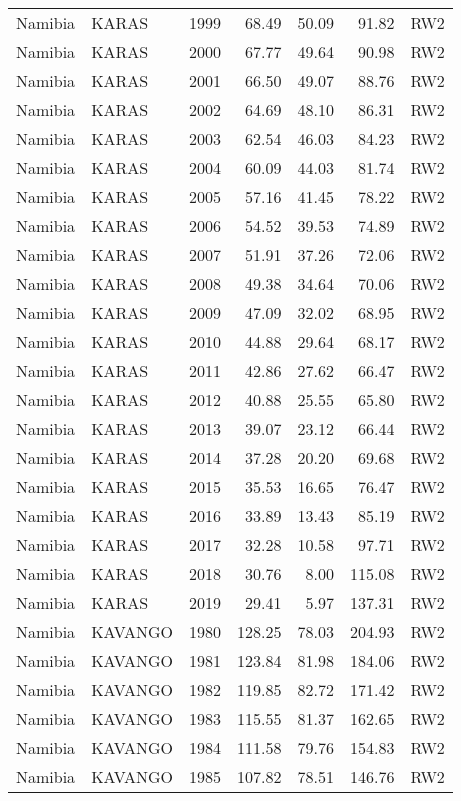 \begin{longtable}{lllrrrl}
  Namibia & KARAS & 1999 & 68.49 & 50.09 & 91.82 & RW2 \\ 
  Namibia & KARAS & 2000 & 67.77 & 49.64 & 90.98 & RW2 \\ 
  Namibia & KARAS & 2001 & 66.50 & 49.07 & 88.76 & RW2 \\ 
  Namibia & KARAS & 2002 & 64.69 & 48.10 & 86.31 & RW2 \\ 
  Namibia & KARAS & 2003 & 62.54 & 46.03 & 84.23 & RW2 \\ 
  Namibia & KARAS & 2004 & 60.09 & 44.03 & 81.74 & RW2 \\ 
  Namibia & KARAS & 2005 & 57.16 & 41.45 & 78.22 & RW2 \\ 
  Namibia & KARAS & 2006 & 54.52 & 39.53 & 74.89 & RW2 \\ 
  Namibia & KARAS & 2007 & 51.91 & 37.26 & 72.06 & RW2 \\ 
  Namibia & KARAS & 2008 & 49.38 & 34.64 & 70.06 & RW2 \\ 
  Namibia & KARAS & 2009 & 47.09 & 32.02 & 68.95 & RW2 \\ 
  Namibia & KARAS & 2010 & 44.88 & 29.64 & 68.17 & RW2 \\ 
  Namibia & KARAS & 2011 & 42.86 & 27.62 & 66.47 & RW2 \\ 
  Namibia & KARAS & 2012 & 40.88 & 25.55 & 65.80 & RW2 \\ 
  Namibia & KARAS & 2013 & 39.07 & 23.12 & 66.44 & RW2 \\ 
  Namibia & KARAS & 2014 & 37.28 & 20.20 & 69.68 & RW2 \\ 
  Namibia & KARAS & 2015 & 35.53 & 16.65 & 76.47 & RW2 \\ 
  Namibia & KARAS & 2016 & 33.89 & 13.43 & 85.19 & RW2 \\ 
  Namibia & KARAS & 2017 & 32.28 & 10.58 & 97.71 & RW2 \\ 
  Namibia & KARAS & 2018 & 30.76 & 8.00 & 115.08 & RW2 \\ 
  Namibia & KARAS & 2019 & 29.41 & 5.97 & 137.31 & RW2 \\ 
  Namibia & KAVANGO & 1980 & 128.25 & 78.03 & 204.93 & RW2 \\ 
  Namibia & KAVANGO & 1981 & 123.84 & 81.98 & 184.06 & RW2 \\ 
  Namibia & KAVANGO & 1982 & 119.85 & 82.72 & 171.42 & RW2 \\ 
  Namibia & KAVANGO & 1983 & 115.55 & 81.37 & 162.65 & RW2 \\ 
  Namibia & KAVANGO & 1984 & 111.58 & 79.76 & 154.83 & RW2 \\ 
  Namibia & KAVANGO & 1985 & 107.82 & 78.51 & 146.76 & RW2 \\ 

\end{longtable}

